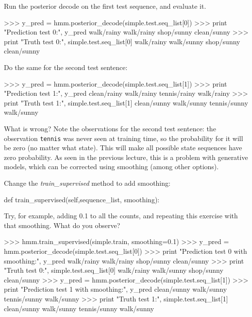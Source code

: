 \begin{exercise}
Run the posterior decode on the first test sequence, and evaluate it.
\begin{python}
>>> y_pred = hmm.posterior_decode(simple.test.seq_list[0])
>>> print "Prediction test 0:", y_pred
walk/rainy walk/rainy shop/sunny clean/sunny
>>> print "Truth test 0:", simple.test.seq_list[0]
walk/rainy walk/sunny shop/sunny clean/sunny 
\end{python}

Do the same for the second test sentence:
\begin{python}
>>> y_pred = hmm.posterior_decode(simple.test.seq_list[1])
>>> print "Prediction test 1:", y_pred
clean/rainy walk/rainy tennis/rainy walk/rainy 
>>> print "Truth test 1:", simple.test.seq_list[1]
clean/sunny walk/sunny tennis/sunny walk/sunny 
\end{python}

What is wrong? Note the observations for the second test sentence: the
observation {\tt tennis} was never seen at training time, so the probability for
it will be zero (no matter what state). This will make all possible state
sequences have zero probability.
As seen in the previous lecture, this is a problem with generative
models, which can be corrected using smoothing (among other
options).

Change the \emph{train\_supervised} method to add smoothing:
\begin{python}
def train_supervised(self,sequence_list, smoothing):
\end{python}

Try, for example, adding 0.1 to all the counts, and repeating this exercise with that smoothing. What do you observe?
\begin{python}
>>> hmm.train_supervised(simple.train, smoothing=0.1)
>>> y_pred = hmm.posterior_decode(simple.test.seq_list[0])
>>> print "Prediction test 0 with smoothing:", y_pred
walk/rainy walk/rainy shop/sunny clean/sunny 
>>> print "Truth test 0:", simple.test.seq_list[0]
walk/rainy walk/sunny shop/sunny clean/sunny
>>> y_pred = hmm.posterior_decode(simple.test.seq_list[1])
>>> print "Prediction test 1 with smoothing:", y_pred
clean/sunny walk/sunny tennis/sunny walk/sunny 
>>> print "Truth test 1:", simple.test.seq_list[1]
clean/sunny walk/sunny tennis/sunny walk/sunny 
\end{python}
\end{exercise}



